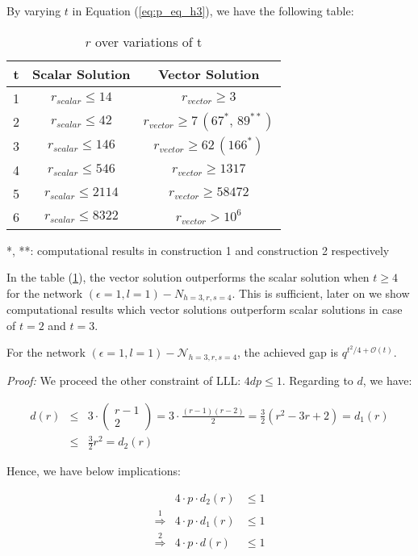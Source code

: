 By varying $t$ in Equation (\ref{eq:p_eq_h3}), we have the following
table:

\begin{table}[H]
\caption{$r$ over variations of t\label{tab:r_over_t}}

\begin{tabular}{|c|c|c|}
\hline 
t & Scalar Solution & Vector Solution\tabularnewline
\hline 
\hline 
1 & $r_{scalar}\leq14$ & $r_{vector}\geq3$\tabularnewline
\hline 
2 & $r_{scalar}\leq42$ & $r_{vector}\geq7\,\left(67^{*},\,89^{**}\right)$\tabularnewline
\hline 
3 & $r_{scalar}\leq146$ & $r_{vector}\geq62\,\left(166^{*}\right)$ \tabularnewline
\hline 
4 & $r_{scalar}\leq546$ & $r_{vector}\geq1317$\tabularnewline
\hline 
5 & $r_{scalar}\leq2114$ & $r_{vector}\geq58472$\tabularnewline
\hline 
6 & $r_{scalar}\leq8322$ & $r_{vector}>10^{6}$\tabularnewline
\hline 
\end{tabular}

{*}, {*}{*}: computational results in construction 1 and construction
2 respectively
\end{table}

In the table (\ref{tab:r_over_t}), the vector solution outperforms
the scalar solution when $t\geq4$ for the network $\left(\epsilon=1,l=1\right)-\ensuremath{N}_{h=3,r,s=4}$.
This is sufficient, later on we show computational results which vector
solutions outperform scalar solutions in case of $t=2$ and $t=3$.
\begin{conjecture}
For the network $\left(\epsilon=1,l=1\right)-\mathcal{N}_{h=3,r,s=4}$,
the achieved gap is $q^{t^{2}/4+\mathcal{O}(t)}$.
\end{conjecture}
\textit{Proof:} We proceed the other constraint of LLL: $4dp\leq1$.
Regarding to $d$, we have:

\begin{eqnarray*}
d(r) & \leq & 3\cdot\left(\begin{array}{c}
r-1\\
2
\end{array}\right)=3\cdot\frac{\left(r-1\right)\left(r-2\right)}{2}=\frac{3}{2}\left(r^{2}-3r+2\right)=d_{1}(r)\\
 & \leq & \frac{3}{2}r^{2}=d_{2}(r)
\end{eqnarray*}

Hence, we have below implications:

\begin{eqnarray*}
 & 4\cdot p\cdot d_{2}(r) & \leq1\\
\overset{1}{\Rightarrow} & 4\cdot p\cdot d_{1}(r) & \leq1\\
\overset{2}{\Rightarrow} & 4\cdot p\cdot d(r) & \leq1
\end{eqnarray*}

